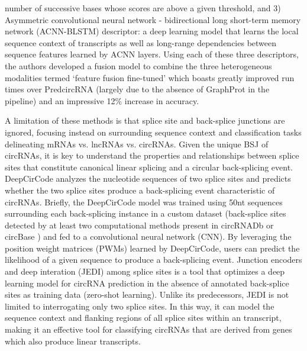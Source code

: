 number of successive bases whose scores are above a given threshold, and 3) Asymmetric convolutional neural network - bidirectional long short-term memory network (ACNN-BLSTM) descriptor: a deep learning model that learns the local sequence context of transcripts as well as long-range dependencies between sequence features learned by ACNN layers. Using each of these three descriptors, the authors developed a fusion model to combine the three heterogeneous modalities termed `feature fusion fine-tuned' which boasts greatly improved run times over PredcircRNA (largely due to the absence of GraphProt in the pipeline) and an impressive 12\% increase in accuracy. \par
A limitation of these methods is that splice site and back-splice junctions are ignored, focusing instead on surrounding sequence context and classification tasks delineating mRNAs vs. lncRNAs vs. circRNAs. Given the unique BSJ of circRNAs, it is key to understand the properties and relationships between splice sites that constitute canonical linear splicing and a circular back-splicing event. DeepCirCode \cite{DeepCirCode} analyzes the nucleotide sequences of two splice sites and predicts whether the two splice sites produce a back-splicing event characteristic of circRNAs. Briefly, the DeepCirCode model was trained using 50nt sequences surrounding each back-splicing instance in a custom dataset (back-splice sites detected by at least two computational methods present in circRNADb \cite{circrnadb} or circBase \cite{circbase}) and fed to a convolutional neural network (CNN). By leveraging the position weight matrices (PWMs) learned by DeepCirCode, users can predict the likelihood of a given sequence to produce a back-splicing event. Junction encoders and deep interation (JEDI) among splice sites \cite{JEDI} is a tool that optimizes a deep learning model for circRNA prediction in the absence of annotated back-splice sites as training data (zero-shot learning). Unlike its predecessors, JEDI is not limited to interrogating only two splice sites. In this way, it can model the sequence context and flanking regions of all splice sites within an transcript, making it an effective tool for classifying circRNAs that are derived from genes which also produce linear transcripts.\par
